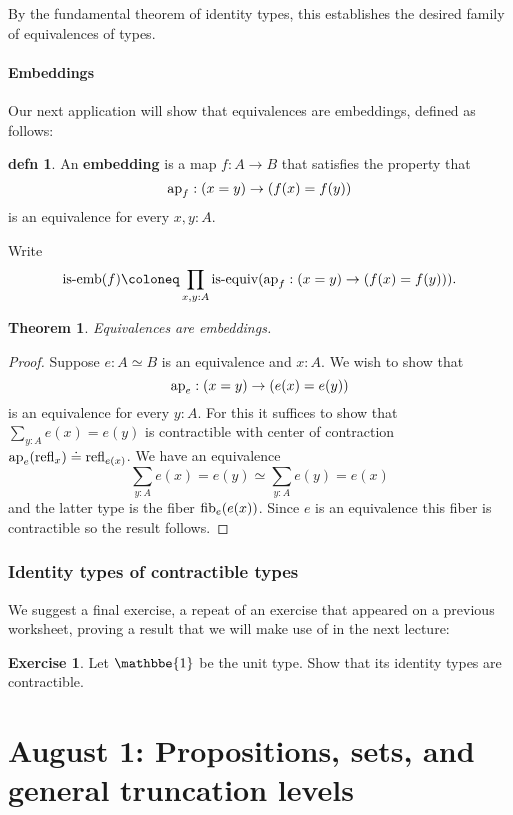 \documentclass{amsart}
\theoremstyle{theorem}
\newtheorem*{thm}{Theorem}
\theoremstyle{definition}
\newtheorem*{defn}{defn}
\newtheorem*{exc}{Exercise}
\theoremstyle{remark}
\newcommand{\0}{\mathbbe{0}}
\newcommand{\1}{\mathbbe{1}}
\newcommand{\2}{\mathbbe{2}}
\newcommand{\3}{\mathbbe{3}}
\newcommand{\4}{\mathbbe{4}}
\newcommand{\term}[1]{{\textup{#1}}}
\newcommand{\type}[1]{{\textup{#1}}}
\newcommand{\refl}{\term{refl}}
\newcommand{\ap}{\term{ap}}
\newcommand{\is}[1]{\type{is-{#1}}}
\newcommand{\fib}{\type{fib}}
\begin{document}
By the fundamental theorem of identity types, this establishes the desired family of equivalences of types.

\subsection*{Embeddings}

Our next application will show that equivalences are embeddings, defined as follows:

\begin{defn} An \textbf{embedding} is a map $f \colon A \to B$ that satisfies the property that
\[ \ap_f : (x=y) \to (f(x)=f(y))\]
is an equivalence for every $x,y :A$.
\end{defn}

Write
\[ \is{emb}(f) \coloneq \prod_{x,y:A} \is{equiv}(\ap_f : (x=y) \to (f(x)=f(y))).\]

\begin{thm} Equivalences are embeddings.
\end{thm}
\begin{proof}
Suppose $e : A \simeq B$ is an equivalence and $x:A$. We wish to show that
\[ \ap_e : (x=y) \to (e(x)=e(y))\] is an equivalence for every $y :A$. For this it suffices to show that $\sum_{y:A}e(x) =e(y)$ is contractible with center of contraction $\ap_e(\refl_x) \doteq \refl_{e(x)}$. We have an equivalence
\[ \sum_{y:A}e(x)=e(y) \simeq \sum_{y:A} e(y) = e(x)\]
and the latter type is the fiber $\fib_e(e(x))$. Since $e$ is an equivalence this fiber is contractible so the result follows.
\end{proof}

\section*{Identity types of contractible types}

We suggest a final exercise, a repeat of an exercise that appeared on a previous worksheet, proving a result that we will make use of in the next lecture:

\begin{exc} Let $\1$ be the unit type. Show that its identity types are contractible.
\end{exc}

\part*{August 1: Propositions, sets, and general truncation levels}
\end{document}
